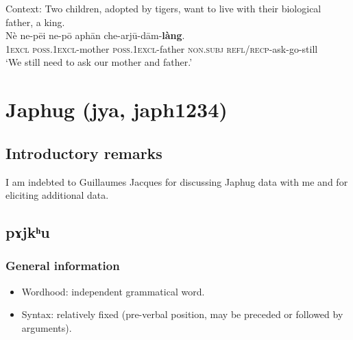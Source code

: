 \begin{exe}
		\ex\label{exAppendixKarbiFurtherTo4}
	Context: Two children, adopted by tigers, want to live with their biological father, a king.\\
	\gll Nè ne-pēi ne-pō aphān che-arjū-dām-\textbf{làng}.\\
	1\textsc{excl} \textsc{poss}.1\textsc{excl}-mother \textsc{poss}.1\textsc{excl}-father \textsc{non}.\textsc{subj} \textsc{refl}/\textsc{recp}-ask-go-still\\
	\glt \lq We still need to ask our mother and father.\rq{ }\parencite[154]{KonnerthTisso2018}
\end{exe}

\section{Japhug (jya, japh1234)}

\subsection{Introductory remarks}
I am indebted to Guillaumes Jacques for discussing Japhug data with me and for eliciting additional data.

\subsection{pɤjkʰu}
\subsubsection{General information}
\begin{itemize}
	\item Wordhood: independent grammatical word.
	\item Syntax: relatively fixed (pre-verbal position, may be preceded or followed by arguments).
\end{itemize}

